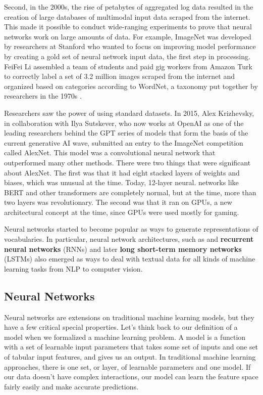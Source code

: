 \documentclass[11pt, table]{diazessay} %
\begin{document}
\begin{sloppypar}
Second, in the 2000s, the rise of petabytes of aggregated log data resulted in the creation of large databases of multimodal input data scraped from the internet. This made it possible to conduct wide-ranging experiments to prove that neural networks work on large amounts of data. For example, ImageNet was developed by researchers at Stanford who wanted to focus on improving model performance by creating a gold set of neural network input data, the first step in processing. FeiFei Li assembled a team of students and paid gig workers from Amazon Turk to correctly label a set of 3.2 million images scraped from the internet and organized based on categories according to WordNet, a taxonomy put together by researchers in the 1970s \citep{russakovsky2015imagenet}.

Researchers saw the power of using standard datasets. In 2015, Alex Krizhevsky, in collaboration with Ilya Sutskever, who now works at OpenAI as one of the leading researchers behind the GPT series of models that form the basis of the current generative AI wave, submitted an entry to the ImageNet competition called AlexNet. This model was a convolutional neural network that outperformed many other methods. There were two things that were significant about AlexNet. The first was that it had eight stacked layers of weights and biases, which was unusual at the time. Today, 12-layer neural. networks like BERT and other transformers are completely normal, but at the time, more than two layers was revolutionary. The second was that it ran on GPUs, a new architectural concept at the time, since GPUs were used mostly for gaming.

Neural networks started to become popular as ways to generate representations of vocabularies. In particular, neural network architectures, such as  and \textbf{recurrent neural networks} (RNNs) and later \textbf{long short-term memory networks} (LSTMs) also emerged as ways to deal with textual data for all kinds of machine learning tasks from NLP to computer vision.


\subsection{Neural Networks}

Neural networks are extensions on traditional machine learning models, but they have a few critical special properties. Let's think back to our definition of a model when we formalized a machine learning problem. A model is a function with a set of learnable input parameters that takes some set of inputs and one set of tabular input features, and gives us an output. In traditional machine learning approaches, there is one set, or layer, of learnable parameters and  one model. If our data doesn't have complex interactions, our model can learn the feature space fairly easily and make accurate predictions.


\end{sloppypar}
\end{document}
